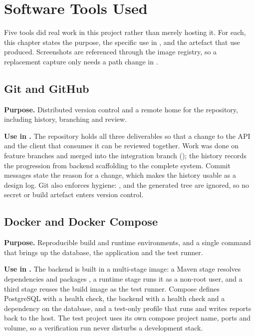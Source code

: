 \chapter{Software Tools Used}

Five tools did real work in this project rather than merely hosting it. For each,
this chapter states the purpose, the specific use in \project{}, and the artefact
that use produced. Screenshots are referenced through the image registry, so a
replacement capture only needs a path change in .

\section{Git and GitHub}

\textbf{Purpose.} Distributed version control and a remote home for the repository,
including history, branching and review.

\textbf{Use in \project{}.} The repository holds all three deliverables so that a
change to the API and the client that consumes it can be reviewed together. Work
was done on feature branches and merged into the integration branch
(); the history records the progression from backend scaffolding
to the complete system. Commit messages state the reason for a change, which makes
the history usable as a design log. Git also enforces hygiene: ,
 and the generated  tree are ignored, so no secret or
build artefact enters version control.


\section{Docker and Docker Compose}

\textbf{Purpose.} Reproducible build and runtime environments, and a single command
that brings up the database, the application and the test runner.

\textbf{Use in \project{}.} The backend is built in a multi-stage image: a Maven
stage resolves dependencies and packages , a runtime stage runs
it as a non-root user, and a third stage reuses the build image as the test runner.
Compose defines PostgreSQL with a health check, the backend with a health check and a
dependency on the database, and a test-only profile that runs  and
writes reports back to the host. The test project uses its own compose project name,
ports and volume, so a verification run never disturbs a development stack.

